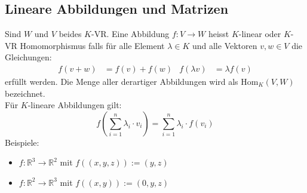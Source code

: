 \subsection{Lineare Abbildungen und Matrizen}
Sind $W$ und $V$ beides $K$-VR. Eine Abbildung $f: V \rightarrow W$ heisst $K$-linear oder $K$-VR Homomorphismus falls für alle Element $\lambda \in K$ und alle Vektoren $v, w \in V$ die Gleichungen:
\begin{align*}
	f(v + w)& = f(v) + f(w) & f(\lambda v)& = \lambda f(v)
\end{align*}
erfüllt werden. Die Menge aller derartiger Abbildungen wird als Hom$_K (V, W)$ bezeichnet.\\
Für $K$-lineare Abbildungen gilt:
\begin{equation*}
	f(\sum_{i=1}^n \lambda_i \cdot v_i) = \sum_{i=1}^n \lambda_i \cdot f(v_i)
\end{equation*}
Beispiele: 
\begin{itemize}\itemsep0em
	\item $f: \mathbb{R}^3 \rightarrow \mathbb{R}^2$ mit $f((x, y, z)) := (y, z)$
	\item $f: \mathbb{R}^2 \rightarrow \mathbb{R}^3$ mit $f((x, y)) := (0, y, z)$
\end{itemize}

